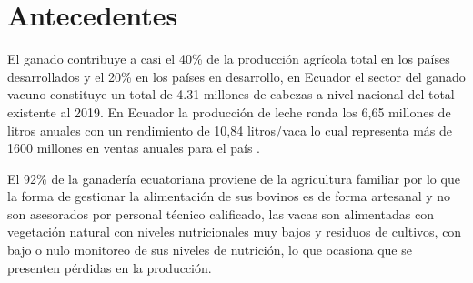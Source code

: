 \section{Antecedentes}

El ganado contribuye a casi el 40\% de la producción agrícola total en los países desarrollados y el 20\% en los países en desarrollo, en Ecuador el sector del ganado vacuno constituye un total de 4.31 millones de cabezas a nivel nacional del total existente al 2019.
En Ecuador la producción de leche ronda los 6,65 millones de litros anuales con un rendimiento de 10,84 litros/vaca lo cual representa más de 1600 millones en ventas anuales para el país \cite{Encuesta}.

El 92\% de la ganadería ecuatoriana proviene de la agricultura familiar por lo que la forma de gestionar la alimentación de sus bovinos es de forma artesanal y no son asesorados por personal técnico calificado, las vacas son alimentadas  con vegetación natural con niveles nutricionales muy bajos y residuos de cultivos, con bajo o nulo monitoreo de sus niveles de nutrición, lo que ocasiona que se presenten pérdidas en la producción.   

\vspace{5mm} %